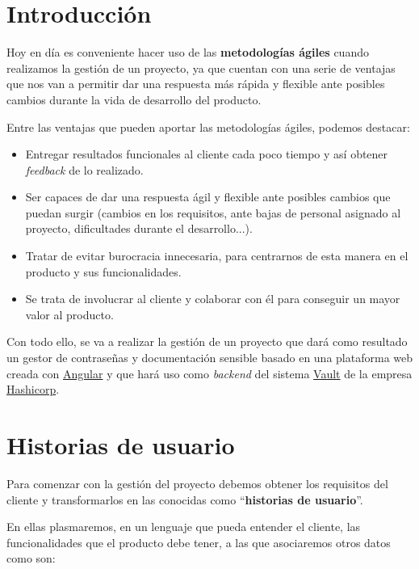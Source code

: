 \documentclass{\ClassPath/viu-tfm-template}
\begin{document}
    \graphicspath{{../VIU_TFM_LaTeX_template/}}

    \coverpage

    \tableofcontents

\chapter{Introducción}

Hoy en día es conveniente hacer uso de las \textbf{metodologías ágiles} cuando realizamos la gestión de un proyecto, ya que cuentan con una serie de ventajas que nos van a permitir dar una respuesta más rápida y flexible ante posibles cambios durante la vida de desarrollo del producto.

Entre las ventajas que pueden aportar las metodologías ágiles, podemos destacar:

\begin{itemize}
    \item Entregar resultados funcionales al cliente cada poco tiempo y así obtener \textit{feedback} de lo realizado.
    \item Ser capaces de dar una respuesta ágil y flexible ante posibles cambios que puedan surgir (cambios en los requisitos, ante bajas de personal asignado al proyecto, dificultades durante el desarrollo...).
    \item Tratar de evitar burocracia innecesaria, para centrarnos de esta manera en el producto y sus funcionalidades.
    \item Se trata de involucrar al cliente y colaborar con él para  conseguir un mayor valor al producto.
\end{itemize}

Con todo ello, se va a realizar la gestión de un proyecto que dará como resultado un gestor de contraseñas y documentación sensible basado en una plataforma web creada con \href{https://angular.io/}{Angular} y que hará uso como \textit{backend} del sistema \href{https://www.vaultproject.io/}{Vault} de la empresa \href{https://www.hashicorp.com/}{Hashicorp}.


\chapter{Historias de usuario}

Para comenzar con la gestión del proyecto debemos obtener los requisitos del cliente y transformarlos en las conocidas como “\textbf{historias de usuario}”.

En ellas plasmaremos, en un lenguaje que pueda entender el cliente, las funcionalidades que el producto debe tener, a las que asociaremos otros datos como son:
\end{document}
